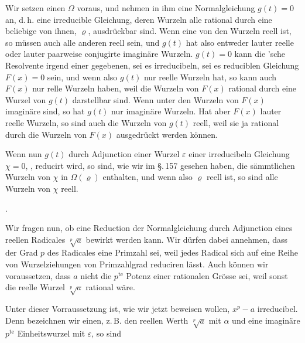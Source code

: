 
%
\quad Wir setzen einen  $\Omega$ voraus,
und nehmen in ihm eine Normalgleichung $g(t) = 0$ an,
d.\,h. eine irreducible Gleichung, deren Wurzeln alle rational
durch eine beliebige von ihnen, $\varrho$, ausdrückbar sind. Wenn eine
von den Wurzeln reell ist, so müssen auch alle anderen reell
sein, und $g(t)$ hat also entweder lauter reelle oder lauter paarweise
conjugirte imaginäre Wurzeln. $g(t) = 0$ kann die 'sche
Resolvente irgend einer gegebenen, sei es irreducibeln, sei es
reduciblen Gleichung $F(x) = 0$ sein, und wenn also $g(t)$ nur
reelle Wurzeln hat, so kann auch $F(x)$ nur relle Wurzeln haben, %
weil die Wurzeln von $F(x)$ rational durch eine Wurzel von $g(t)$
darstellbar sind. Wenn unter den Wurzeln von $F(x)$ imaginäre
sind, so hat $g(t)$ nur imaginäre Wurzeln. Hat aber $F(x)$
lauter reelle Wurzeln, so sind auch die Wurzeln von $g(t)$ reell,
weil sie ja rational durch die Wurzeln von $F(x)$ ausgedrückt
werden können.

\quad Wenn nun $g(t)$ durch Adjunction einer Wurzel $\varepsilon$ einer
irreducibeln Gleichung $\chi = 0$, ,
reducirt wird, so sind, wie wir im \S.\,157 gesehen haben, die
sämmtlichen Wurzeln von $\chi$ in $\Omega(\varrho)$ enthalten, und wenn also
$\varrho$ reell ist, so sind alle Wurzeln von $\chi$ reell.

. 

\quad Wir fragen nun, ob eine Reduction der Normalgleichung
durch Adjunction eines reellen Radicales $\sqrt[p]{a}$ bewirkt werden
kann. Wir dürfen dabei annehmen, dass der Grad $p$ des Radicales
eine Primzahl sei, weil jedes Radical sich auf eine Reihe von
Wurzelziehungen von Primzahlgrad reduciren lässt. Auch können
wir voraussetzen, dass $a$ nicht die $p^{\text{te}}$ Potenz einer rationalen
Grösse sei, weil sonst die reelle Wurzel $\sqrt[p]{a}$ rational wäre.

\quad Unter dieser Vorraussetzung ist, wie wir jetzt beweisen wollen, %
$x^p - a$ irreducibel. Denn bezeichnen wir einen, z.\,B. den reellen
Werth $\sqrt[p]{a}$ mit $\alpha$ und eine imaginäre $p^{\text{te}}$ Einheitswurzel mit $\varepsilon$,
so sind
